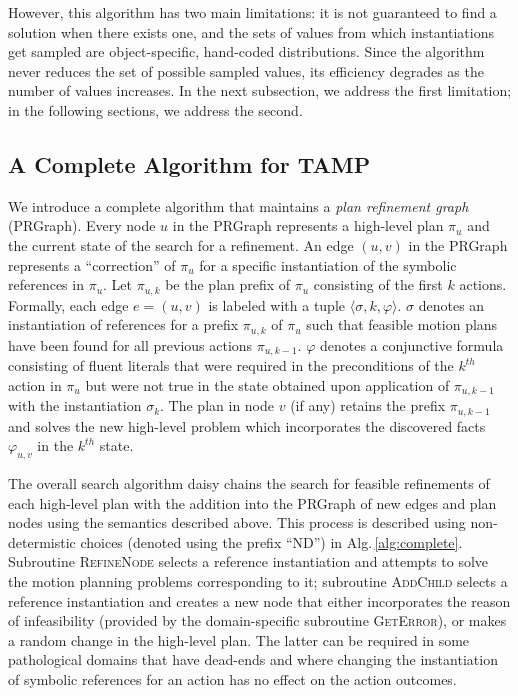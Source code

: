 However, this algorithm has two
main limitations: it is not guaranteed to find a solution when
there exists one, and the sets of values from which instantiations
get sampled are object-specific, hand-coded distributions. Since the algorithm
never reduces the set of possible sampled values, its
efficiency degrades as the number of values increases. In the next subsection,
we address the first limitation; in the following sections, we address the second.

\subsection{A Complete Algorithm for TAMP}
We introduce a complete algorithm that maintains a \emph{plan
  refinement graph} (PRGraph). Every node $u$ in the PRGraph
represents a high-level plan $\pi_u$ and the current state of the search
for a refinement. An edge $(u,v)$ in the PRGraph
represents a ``correction'' of $\pi_u$ for a specific instantiation of
the symbolic references in $\pi_u$. Let $\pi_{u,k}$ be the plan prefix of
$\pi_u$ consisting of the first $k$ actions. Formally, each edge
$e=(u,v)$ is labeled with a tuple $\langle \sigma, k, \varphi \rangle$.
$\sigma$ denotes an instantiation of references for a prefix $\pi_{u,k}$ of
$\pi_u$ such that feasible motion plans have been found for all
previous actions $\pi_{u,k-1}$. $\varphi$ denotes a conjunctive formula
consisting of fluent literals
that were required in the preconditions of the $k^{th}$ action in
$\pi_u$ but were not true in the state obtained upon
application of $\pi_{u,k-1}$ with the instantiation $\sigma_k$.  The
plan in node $v$ (if any) retains the prefix $\pi_{u,k-1}$ and solves
the new high-level problem which incorporates the discovered facts $\varphi_{u,v}$
in the $k^{th}$ state.

The overall search algorithm daisy chains the search for feasible
refinements of each high-level plan with the addition into the
PRGraph of new edges and plan nodes using the semantics described
above. This process is described using non-determistic choices
(denoted using the prefix ``ND'') in
Alg.\,\ref{alg:complete}. Subroutine \textsc{RefineNode} selects a
reference instantiation and attempts to solve the motion planning
problems corresponding to it; subroutine \textsc{AddChild} selects a
reference instantiation and creates a new node that either
incorporates the reason of infeasibility (provided by the
domain-specific subroutine \textsc{GetError}), or makes a random
change in the high-level plan. The latter can be required in some
pathological domains that have dead-ends and where changing the
instantiation of symbolic references for an action has no effect on the
action outcomes.


